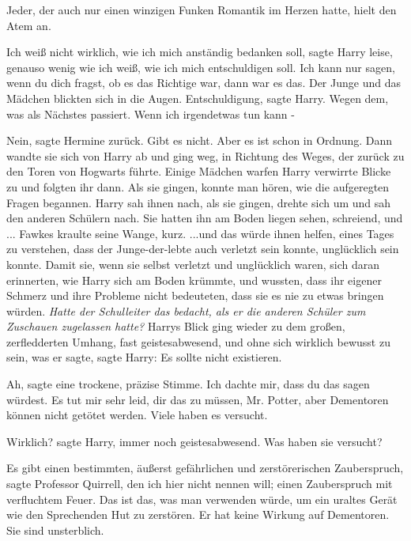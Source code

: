 Jeder, der auch nur einen winzigen Funken Romantik im Herzen hatte, hielt den
Atem an.

\glqq{}Ich weiß nicht wirklich, wie ich mich anständig bedanken soll\grqq{},
sagte Harry leise, \glqq{}genauso wenig wie ich weiß, wie ich mich entschuldigen
soll. Ich kann nur sagen, wenn du dich fragst, ob es das Richtige war, dann war
es das.\grqq{} Der Junge und das Mädchen blickten sich in die Augen. \glqq{}
Entschuldigung\grqq{}, sagte Harry. \glqq{}Wegen dem, was als Nächstes passiert.
Wenn ich irgendetwas tun kann -\grqq{}

\glqq{}Nein\grqq{}, sagte Hermine zurück. \glqq{}Gibt es nicht. Aber es ist schon
in Ordnung.\grqq{} Dann wandte sie sich von Harry ab und ging weg, in Richtung des
Weges, der zurück zu den Toren von Hogwarts führte. Einige Mädchen warfen Harry
verwirrte Blicke zu und folgten ihr dann. Als sie gingen, konnte man hören, wie
die aufgeregten Fragen begannen. Harry sah ihnen nach, als sie gingen, drehte
sich um und sah den anderen Schülern nach. Sie hatten ihn am Boden liegen sehen,
schreiend, und ... Fawkes kraulte seine Wange, kurz. ...und das würde ihnen
helfen, eines Tages zu verstehen, dass der Junge-der-lebte auch verletzt sein
konnte, unglücklich sein konnte. Damit sie, wenn sie selbst verletzt und
unglücklich waren, sich daran erinnerten, wie Harry sich am Boden krümmte, und
wussten, dass ihr eigener Schmerz und ihre Probleme nicht bedeuteten, dass sie
es nie zu etwas bringen würden. \emph{ Hatte der Schulleiter das bedacht, als er
die anderen Schüler zum Zuschauen zugelassen hatte?} Harrys Blick ging wieder zu
dem großen, zerfledderten Umhang, fast geistesabwesend, und ohne sich wirklich
bewusst zu sein, was er sagte, sagte Harry: \glqq{}Es sollte nicht existieren.\grqq{}

\glqq{}Ah\grqq{}, sagte eine trockene, präzise Stimme. \glqq{}Ich dachte mir, dass
du das sagen würdest. Es tut mir sehr leid, dir das zu müssen, Mr. Potter, aber
Dementoren können nicht getötet werden. Viele haben es versucht.\grqq{}

\glqq{}Wirklich?\grqq{} sagte Harry, immer noch geistesabwesend. \glqq{}Was haben
sie versucht?\grqq{}

\glqq{}Es gibt einen bestimmten, äußerst gefährlichen und zerstörerischen
Zauberspruch\grqq{}, sagte Professor Quirrell, \glqq{}den ich hier nicht nennen
will; einen Zauberspruch mit verfluchtem Feuer. Das ist das, was man verwenden
würde, um ein uraltes Gerät wie den Sprechenden Hut zu zerstören. Er hat keine
Wirkung auf Dementoren. Sie sind unsterblich.\grqq{}

